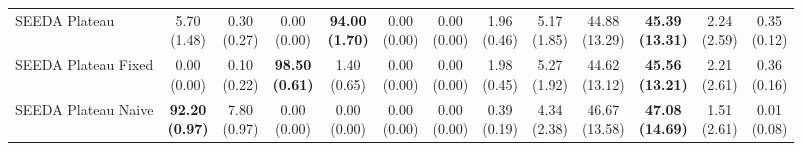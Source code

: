 \begin{table}[H]
{\begin{tabular}{l|cccccc|cccccc}
SEEDA Plateau & \makecell{5.70 \\ (1.48)} & \makecell{0.30 \\ (0.27)} & {\cellcolor[HTML]{C8E6C9}} \makecell{0.00 \\ (0.00)} & \bfseries \makecell{94.00 \\ (1.70)} & \makecell{0.00 \\ (0.00)} & \makecell{0.00 \\ (0.00)} & \makecell{1.96 \\ (0.46)} & \makecell{5.17 \\ (1.85)} & {\cellcolor[HTML]{C8E6C9}} \makecell{44.88 \\ (13.29)} & \bfseries \makecell{45.39 \\ (13.31)} & \makecell{2.24 \\ (2.59)} & \makecell{0.35 \\ (0.12)} \\
SEEDA Plateau Fixed & \makecell{0.00 \\ (0.00)} & \makecell{0.10 \\ (0.22)} & {\cellcolor[HTML]{C8E6C9}} \bfseries \makecell{98.50 \\ (0.61)} & \makecell{1.40 \\ (0.65)} & \makecell{0.00 \\ (0.00)} & \makecell{0.00 \\ (0.00)} & \makecell{1.98 \\ (0.45)} & \makecell{5.27 \\ (1.92)} & {\cellcolor[HTML]{C8E6C9}} \makecell{44.62 \\ (13.12)} & \bfseries \makecell{45.56 \\ (13.21)} & \makecell{2.21 \\ (2.61)} & \makecell{0.36 \\ (0.16)} \\
SEEDA Plateau Naive & \bfseries \makecell{92.20 \\ (0.97)} & \makecell{7.80 \\ (0.97)} & {\cellcolor[HTML]{C8E6C9}} \makecell{0.00 \\ (0.00)} & \makecell{0.00 \\ (0.00)} & \makecell{0.00 \\ (0.00)} & \makecell{0.00 \\ (0.00)} & \makecell{0.39 \\ (0.19)} & \makecell{4.34 \\ (2.38)} & {\cellcolor[HTML]{C8E6C9}} \makecell{46.67 \\ (13.58)} & \bfseries \makecell{47.08 \\ (14.69)} & \makecell{1.51 \\ (2.61)} & \makecell{0.01 \\ (0.08)} \\
\bottomrule
\end{tabular}
}%
\end{table}
